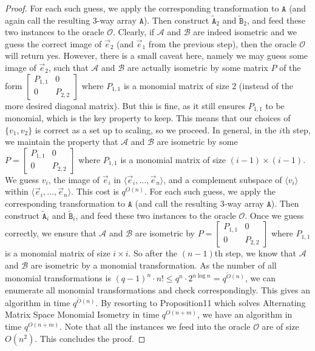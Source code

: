 \begin{proof}
For each such guess, we apply the corresponding transformation to $\mathtt A$ (and again call the resulting 3-way array $\mathtt A$). Then construct $\widetilde{\mathtt A}_2$ and $\widetilde{\mathtt B}_2$, and feed these two instances to the oracle $\mathcal O$. Clearly, if $\mathcal A$ and $\mathcal B$ are indeed isometric and we guess the correct image of $\vec e_2$ (and $\vec e_1$ from the previous step), then the oracle $\mathcal O$ will return yes. However, there is a small caveat here, namely we may guess some image of $\vec e_2$, such that $\mathcal A$ and $\mathcal B$ are actually isometric by some matrix $P$ of the form $\begin{bmatrix}P_{1,1}&0\\0&P_{2,2}\end{bmatrix}$ where $P_{1,1}$ is a monomial matrix of size 2 (instead of the more desired diagonal matrix). But this is fine, as it still ensures $P_{1,1}$ to be monomial, which is the key property to keep. This means that our choices of $\{v_1,v_2\}$ is correct as a set up to scaling, so we proceed.
In general, in the $i$th step, we maintain the property that $\mathcal A$ and $\mathcal B$ are isometric by some $P=\begin{bmatrix}P_{1,1}&0\\0&P_{2,2}\end{bmatrix}$ where $P_{1,1}$ is a monomial matrix of size $(i-1)\times(i-1)$. We guess $v_i$, the image of $\vec e_i$ in $\langle\vec e_i,\ldots,\vec e_n\rangle$, and a complement subspace of $\langle v_i\rangle$ within $\langle\vec e_i,\ldots,\vec e_n\rangle$. This cost is $q^{O(n)}$. For each such guess, we apply the corresponding transformation to $\mathtt A$ (and call the resulting 3-way array $\mathtt A$). Then construct $\widetilde{\mathtt A}_i$ and $\widetilde{\mathtt B}_i$, and feed these two instances to the oracle $\mathcal O$. Once we guess correctly, we ensure that $\mathcal A$ and $\mathcal B$ are isometric by $P=\begin{bmatrix}P_{1,1}&0\\0&P_{2,2}\end{bmatrix}$ where $P_{1,1}$ is a monomial matrix of size $i\times i$.
So after the $(n-1)$th step, we know that $\mathcal A$ and $\mathcal B$ are isometric by a monomial transformation. As the number of all monomial transformations is $(q-1)^n\cdot n!\le q^n\cdot2^{n\log n}=q^{\widetilde O(n)}$, we can enumerate all monomial transformations and check correspondingly. This gives an algorithm in time $q^{\widetilde O(n)}$. By resorting to Proposition11 which solves Alternating Matrix Space Monomial Isometry in time $q^{O(n+m)}$, we have an algorithm in time $q^{O(n+m)}$.
Note that all the instances we feed into the oracle $\mathcal O$ are of size $O(n^2)$. This concludes the proof.
\end{proof}
